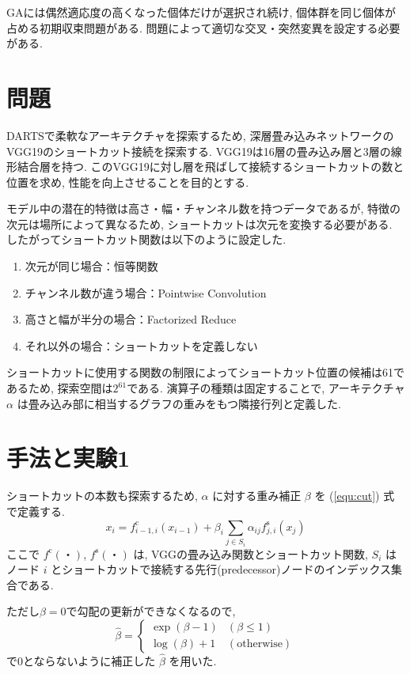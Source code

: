 \documentclass[twocolumn]{jarticle}     %
\begin{document}
GAには偶然適応度の高くなった個体だけが選択され続け,
個体群を同じ個体が占める初期収束問題がある.
問題によって適切な交叉・突然変異を設定する必要がある.

\section{問題}
DARTSで柔軟なアーキテクチャを探索するため,
深層畳み込みネットワークのVGG19\cite{Simonyan15}のショートカット接続を探索する.
VGG19は16層の畳み込み層と3層の線形結合層を持つ.
このVGG19に対し層を飛ばして接続するショートカットの数と位置を求め,
性能を向上させることを目的とする.

モデル中の潜在的特徴は高さ・幅・チャンネル数を持つデータであるが,
特徴の次元は場所によって異なるため, ショートカットは次元を変換する必要がある.
したがってショートカット関数は以下のように設定した.
\begin{enumerate}
  \item 次元が同じ場合：恒等関数
  \item チャンネル数が違う場合：Pointwise Convolution
  \item 高さと幅が半分の場合：Factorized Reduce
  \item それ以外の場合：ショートカットを定義しない
\end{enumerate}
ショートカットに使用する関数の制限によってショートカット位置の候補は61であるため,
探索空間は$2^{61}$である.
演算子の種類は固定することで, アーキテクチャ $\alpha$ は畳み込み部に相当するグラフの重みをもつ隣接行列と定義した.

\section{手法と実験1}

ショートカットの本数も探索するため,
$\alpha$ に対する重み補正 $\beta$ を (\ref{equ:cut}) 式 で定義する.
\begin{equation}
  \label{equ:cut}
  x_i = f^{\mathrm{c}}_{i-1, i}(x_{i-1}) + \beta_i \sum_{j \in S_i} \alpha_{ij} f^{\mathrm{s}}_{j, i} (x_j)
\end{equation}
ここで $f^{\mathrm{c}}(・)$, $f^{\mathrm{s}}(・)$ は, VGGの畳み込み関数とショートカット関数,
$S_i$ はノード $i$ とショートカットで接続する先行(predecessor)ノードのインデックス集合である.

ただし$\beta=0$で勾配の更新ができなくなるので,
\begin{equation}
  \label{equ:beta}
  \hat{\beta} = \begin{cases}
    \exp(\beta - 1) & (\beta \leq 1) \\
    \log(\beta) + 1 & (\mathrm{otherwise})
  \end{cases}
\end{equation}
で0とならないように補正した $\hat{\beta}$ を用いた.
\end{document}
